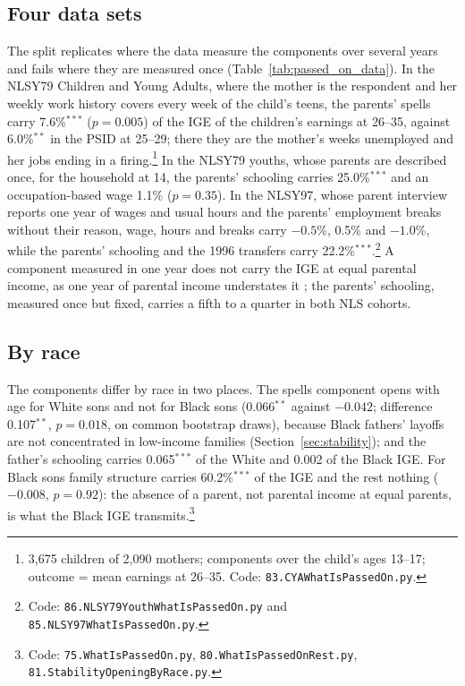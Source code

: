 

\subsection{Four data sets}

The split replicates where the data measure the components over several years and fails where they are measured once
(Table~\ref{tab:passed_on_data}). In the NLSY79 Children and Young Adults, where the mother is the respondent and her
weekly work history covers every week of the child's teens, the parents' spells carry 7.6\%$^{***}$ ($p = 0.005$) of the
IGE of the children's earnings at 26--35, against 6.0\%$^{**}$ in the PSID at 25--29; there they are the mother's weeks
unemployed and her jobs ending in a firing.\footnote{3,675 children of 2,090 mothers; components over the child's ages
13--17; outcome = mean earnings at 26--35. Code: \texttt{83.CYAWhatIsPassedOn.py}.} In the NLSY79 youths, whose
parents are described once, for the household at 14, the parents' schooling carries 25.0\%$^{***}$ and an occupation-based
wage 1.1\% ($p = 0.35$). In the NLSY97, whose parent interview reports one year of wages and usual hours and the
parents' employment breaks without their reason, wage, hours and breaks carry $-0.5$\%, 0.5\% and $-1.0$\%, while the
parents' schooling and the 1996 transfers carry 22.2\%$^{***}$.\footnote{Code: \texttt{86.NLSY79YouthWhatIsPassedOn.py}
and \texttt{85.NLSY97WhatIsPassedOn.py}.} A component measured in one year does not carry the IGE at equal parental
income, as one year of parental income understates it \citep{solon1992intergenerational, mazumder2005fortunate}; the
parents' schooling, measured once but fixed, carries a fifth to a quarter in both NLS cohorts.



\subsection{By race}

The components differ by race in two places. The spells component opens with age for White sons and not for Black sons
(0.066$^{**}$ against $-0.042$; difference 0.107$^{**}$, $p = 0.018$, on common bootstrap draws), because Black fathers'
layoffs are not concentrated in low-income families (Section~\ref{sec:stability}); and the father's schooling carries
0.065$^{***}$ of the White and 0.002 of the Black IGE. For Black sons family structure carries 60.2\%$^{***}$ of the IGE
and the rest nothing ($-0.008$, $p = 0.92$): the absence of a parent, not parental income at equal parents, is what
the Black IGE transmits.\footnote{Code: \texttt{75.WhatIsPassedOn.py}, \texttt{80.WhatIsPassedOnRest.py},
\texttt{81.StabilityOpeningByRace.py}.}
